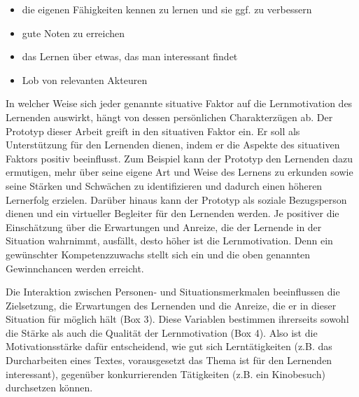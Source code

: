     \begin{minipage}[t]{0.5\textwidth}
    \begin{itemize}
        \item die eigenen Fähigkeiten kennen zu lernen und sie ggf. zu verbessern
        \item gute Noten zu erreichen\\
    \end{itemize}   
    \end{minipage}
    \hfill
    \begin{minipage}[t]{0.5\textwidth}
        \begin{itemize}
        \item das Lernen über etwas, das man interessant findet
        \item Lob von relevanten Akteuren \\
    \end{itemize}
\end{minipage}

    In welcher Weise sich jeder genannte situative Faktor auf die Lernmotivation des Lernenden auswirkt, hängt von dessen persönlichen Charakterzügen ab. \parencite[83]{rheinberg.2000} 
    Der Prototyp dieser Arbeit greift in den situativen Faktor ein. 
    Er soll als Unterstützung für den Lernenden dienen, 
    indem er die Aspekte des situativen Faktors positiv beeinflusst.
    Zum Beispiel kann der Prototyp den Lernenden dazu
    ermutigen, mehr über seine eigene Art und Weise des Lernens zu erkunden sowie seine Stärken und Schwächen zu 
    identifizieren und dadurch einen höheren Lernerfolg erzielen.
    Darüber hinaus kann der Prototyp 
    als soziale Bezugsperson dienen und ein virtueller Begleiter für den Lernenden werden.
    Je positiver die Einschätzung über die Erwartungen und Anreize, die der Lernende in der Situation wahrnimmt, ausfällt, desto höher ist die Lernmotivation.
    Denn ein gewünschter Kompetenzzuwachs stellt sich ein und die oben genannten Gewinnchancen werden erreicht. 

    Die Interaktion zwischen Personen- und Situationsmerkmalen beeinflussen die Zielsetzung, die Erwartungen des Lernenden und die Anreize, die er in dieser Situation für möglich hält (Box 3). Diese Variablen bestimmen ihrerseits sowohl die Stärke als auch die Qualität der Lernmotivation (Box 4). 
    Also ist die Motivationsstärke dafür entscheidend, wie gut sich Lerntätigkeiten (z.B. 
    das Durcharbeiten eines Textes, vorausgesetzt das Thema ist für den Lernenden interessant), gegenüber konkurrierenden Tätigkeiten (z.B. ein Kinobesuch) durchsetzen können. \parencite[20 f.]{marx.2006} 
        
